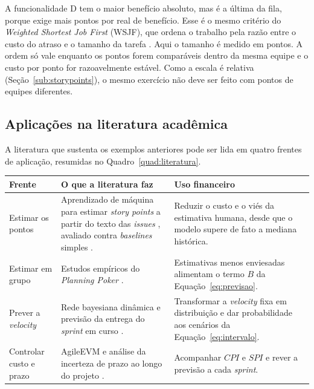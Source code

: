 A funcionalidade D tem o maior benefício absoluto, mas é a última da fila,
porque exige mais pontos por real de benefício. Esse é o mesmo critério do
\textit{Weighted Shortest Job First} (WSJF), que ordena o trabalho pela razão
entre o custo do atraso e o tamanho da tarefa \cite{safewsjf}. Aqui o tamanho
é medido em pontos. A ordem só vale enquanto os pontos forem comparáveis dentro
da mesma equipe e o custo por ponto for razoavelmente estável. Como a escala é
relativa (Seção~\ref{sub:storypoints}), o mesmo exercício não deve ser feito
com pontos de equipes diferentes.

\subsection{Aplicações na literatura acadêmica}
\label{sub:aplic-academicas}

A literatura que sustenta os exemplos anteriores pode ser lida em quatro frentes
de aplicação, resumidas no Quadro~\ref{quad:literatura}.

\begin{quadro}[htbp]
  \caption{Frentes de aplicação da estimativa por histórias de usuário na literatura}
  \label{quad:literatura}
  \small
  \begin{tabular}{@{}p{3.0cm}p{6.0cm}p{5.5cm}@{}}
    \toprule
    \textbf{Frente} & \textbf{O que a literatura faz} & \textbf{Uso financeiro} \\
    \midrule
    \raggedright Estimar os pontos
      & \raggedright Aprendizado de máquina para estimar \textit{story points} a partir do texto das \textit{issues} \cite{choetkiertikul2019,fu2023}, avaliado contra \textit{baselines} simples \cite{tawosi2023}.
      & \raggedright Reduzir o custo e o viés da estimativa humana, desde que o modelo supere de fato a mediana histórica.
      \tabularnewline
    \addlinespace
    \raggedright Estimar em grupo
      & \raggedright Estudos empíricos do \textit{Planning Poker} \cite{haugen2006,molokken2008,mahnic2012}.
      & \raggedright Estimativas menos enviesadas alimentam o termo $B$ da Equação~\ref{eq:previsao}.
      \tabularnewline
    \addlinespace
    \raggedright Prever a \textit{velocity}
      & \raggedright Rede bayesiana dinâmica \cite{hearty2009} e previsão da entrega do \textit{sprint} em curso \cite{choetkiertikul2018}.
      & \raggedright Transformar a \textit{velocity} fixa em distribuição e dar probabilidade aos cenários da Equação~\ref{eq:intervalo}.
      \tabularnewline
    \addlinespace
    \raggedright Controlar custo e prazo
      & \raggedright AgileEVM \cite{sulaiman2006} e análise da incerteza de prazo ao longo do projeto \cite{little2006}.
      & \raggedright Acompanhar $CPI$ e $SPI$ e rever a previsão a cada \textit{sprint}.
      \tabularnewline
    \bottomrule
  \end{tabular}
  \par\vspace{1ex}
\end{quadro}

